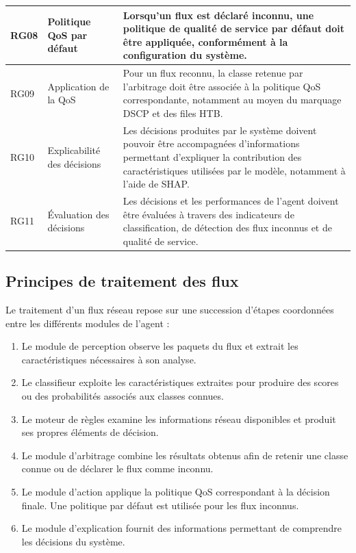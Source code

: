 \begin{table}[H]
\begin{tabularx}{\textwidth}{|p{1.4cm}|p{3.2cm}|Y|}
RG08 & Politique QoS par défaut &
Lorsqu'un flux est déclaré inconnu, une politique de
qualité de service par défaut doit être appliquée,
conformément à la configuration du système. \\
\hline

RG09 & Application de la QoS &
Pour un flux reconnu, la classe retenue par l'arbitrage
doit être associée à la politique QoS correspondante,
notamment au moyen du marquage DSCP et des files HTB. \\
\hline

RG10 & Explicabilité des décisions &
Les décisions produites par le système doivent pouvoir
être accompagnées d'informations permettant d'expliquer
la contribution des caractéristiques utilisées par le
modèle, notamment à l'aide de SHAP. \\
\hline

RG11 & Évaluation des décisions &
Les décisions et les performances de l'agent doivent
être évaluées à travers des indicateurs de classification,
de détection des flux inconnus et de qualité de service. \\
\hline

\end{tabularx}
\end{table}

\subsection{Principes de traitement des flux}

Le traitement d'un flux réseau repose sur une succession
d'étapes coordonnées entre les différents modules de l'agent :

\begin{enumerate}
    \item Le module de perception observe les paquets du flux
    et extrait les caractéristiques nécessaires à son analyse.

    \item Le classifieur exploite les caractéristiques extraites
    pour produire des scores ou des probabilités associés
    aux classes connues.

    \item Le moteur de règles examine les informations réseau
    disponibles et produit ses propres éléments de décision.

    \item Le module d'arbitrage combine les résultats obtenus
    afin de retenir une classe connue ou de déclarer le flux
    comme inconnu.

    \item Le module d'action applique la politique QoS
    correspondant à la décision finale. Une politique
    par défaut est utilisée pour les flux inconnus.

    \item Le module d'explication fournit des informations
    permettant de comprendre les décisions du système.
\end{enumerate}

